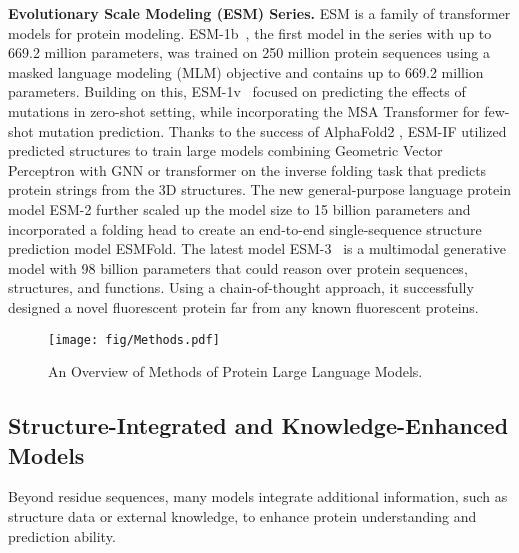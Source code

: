 \noindent \textbf{Evolutionary Scale Modeling (ESM) Series.} ESM is a family of transformer models for protein modeling. 
ESM-1b~\cite{rives2021biological}, the first model in the series with up to 669.2 million parameters, was trained on 250 million protein sequences using a masked language modeling (MLM) objective and contains up to 669.2 million parameters. 
Building on this,  ESM-1v~\citep{meier2021language} focused on predicting the effects of mutations in zero-shot setting, while incorporating the MSA Transformer \citep{rao2021msa} for few-shot mutation prediction. 
Thanks to the success of AlphaFold2 \citep{jumper2021highly}, ESM-IF \citep{hsu2022learning} utilized predicted structures to train large models combining Geometric Vector Perceptron \citep{jing2020learning} with GNN or transformer on the inverse folding task that predicts protein strings from the 3D structures. The new general-purpose language protein model ESM-2 \citep{lin2023evolutionary} further scaled up the model size to 15 billion parameters and incorporated a folding head to create an end-to-end single-sequence structure prediction model ESMFold. The latest model ESM-3~\citep{hayes2025simulating} is a multimodal generative model with 98 billion parameters that could reason over protein sequences, structures, and functions. Using a chain-of-thought approach, it successfully designed a novel fluorescent protein far from any known fluorescent proteins.
\begin{figure*}[htbp]
    \centering
    \texttt{[image: fig/Methods.pdf]}
    \caption{An Overview of Methods of Protein Large Language Models.}
    \label{fig:methods}
\end{figure*}

\subsection{Structure-Integrated and Knowledge-Enhanced Models}

Beyond residue sequences, many models integrate additional information, such as structure data or external knowledge, to enhance protein understanding and prediction ability.

